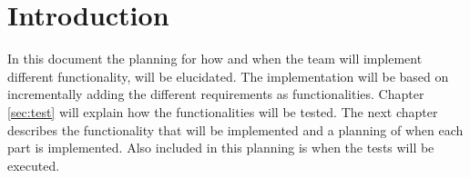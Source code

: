 \chapter{Introduction}
\thispagestyle{fancy}
In this document the planning for how and when the team will implement different functionality, will be elucidated. The implementation will be based on incrementally adding the different requirements as functionalities. Chapter \ref{sec:test} will explain how the functionalities will be tested. The next chapter describes the functionality that will be implemented and a planning of when each part is implemented. Also included in this planning is when the tests will be executed.